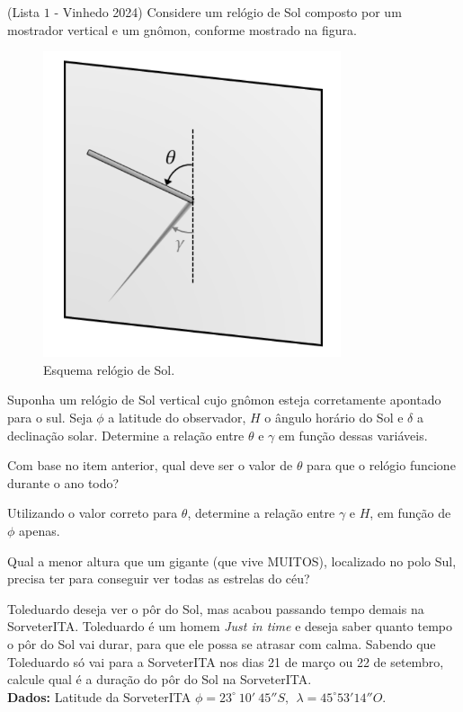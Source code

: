 \documentclass[11pt]{article}
\begin{document}
\begin{pproblem} (Lista \(1\) - Vinhedo 2024) Considere um relógio de Sol composto por um mostrador vertical
    e um gnômon, conforme mostrado na figura.
    \begin{figure}[H]
        \centering
        \includegraphics{imagens/q20.png}
        \caption{Esquema relógio de Sol.}
    \end{figure}
    \begin{alternativas}
        \item Suponha um relógio de Sol vertical cujo gnômon esteja corretamente apontado para o sul.
        Seja \(\phi\) a latitude do observador, \(H\) o ângulo horário do Sol e \(\delta\) a declinação solar. Determine
        a relação entre \(\theta\) e \(\gamma\) em função dessas variáveis.
        
        \item Com base no item anterior, qual deve ser o valor de \(\theta\) para que o relógio funcione durante o ano todo?

        \item Utilizando o valor correto para \(\theta\), determine a relação entre \(\gamma\) e \(H\), em função de \(\phi\) apenas.
    \end{alternativas}
\end{pproblem}


\begin{pproblem}
    Qual a menor altura que um gigante (que vive MUITOS), localizado no polo Sul, precisa ter para conseguir ver todas as estrelas do céu?
\end{pproblem}


\begin{pproblem}
    Toleduardo deseja ver o pôr do Sol, mas acabou passando tempo demais na SorveterITA. Toleduardo é um homem \textit{Just in time} e deseja saber quanto tempo o pôr do Sol vai durar, para que ele possa se atrasar com calma. Sabendo que Toleduardo só vai para a SorveterITA nos dias 21 de março ou 22 de setembro, calcule qual é a duração do pôr do Sol na SorveterITA.
    \\
    \textbf{Dados: } Latitude da SorveterITA \(\phi = 23^\circ \ 10' \ 45''S, \ \ \lambda = 45^\circ 53' 14''O\).
\end{pproblem}
\end{document}
